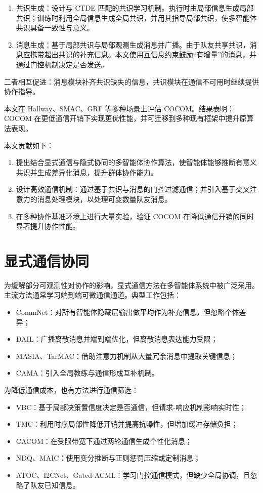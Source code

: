 \begin{enumerate}
    \item 共识生成：设计与 CTDE 匹配的共识学习机制。执行时由局部信息生成局部共识；训练时利用全局信息生成全局共识，并用其指导局部共识，使多智能体共识具备一致性与意义。
    \item 消息生成：基于局部共识与局部观测生成消息并广播。由于队友共享共识，消息应携带超出共识的补充信息。本文使用互信息约束鼓励“有增量”的消息，并通过门控机制决定是否发送。
\end{enumerate}

二者相互促进：消息模块补齐共识缺失的信息，共识模块在通信不可用时继续提供协作指导。

本文在 Hallway、SMAC、GRF 等多种场景上评估 COCOM。结果表明：COCOM 在更低通信开销下实现更优性能，并可迁移到多种现有框架中提升原算法表现。

本文贡献如下：

\begin{enumerate}
    \item 提出结合显式通信与隐式协同的多智能体协作算法，使智能体能够推断有意义共识并生成差异化消息，提升群体协作能力。
    \item 设计高效通信机制：通过基于共识与消息的门控过滤通信；并引入基于交叉注意力的消息处理模块，以处理可变数量队友消息。
    \item 在多种协作基准环境上进行大量实验，验证 COCOM 在降低通信开销的同时显著提升协作性能。
\end{enumerate}

\section*{显式通信协同}

为缓解部分可观测性对协作的影响，显式通信方法在多智能体系统中被广泛采用。主流方法通常学习端到端可微通信通道。典型工作包括：

\begin{itemize}
    \item CommNet：对所有智能体隐藏层输出做平均作为补充信息，但忽略个体差异；
    \item DAIL：广播离散消息并端到端优化，但离散消息表达能力受限；
    \item MASIA、TarMAC：借助注意力机制从大量冗余消息中提取关键信息；
    \item CAMA：引入全局教练与通信形成互补机制。
\end{itemize}

为降低通信成本，也有方法进行通信筛选：

\begin{itemize}
    \item VBC：基于局部决策置信度决定是否通信，但请求-响应机制影响实时性；
    \item TMC：利用时序局部性降低开销并提高抗噪性，但增加缓冲存储负担；
    \item CACOM：在受限带宽下通过两轮通信生成个性化消息；
    \item NDQ、MAIC：使用变分推断与正则惩罚压缩或定制消息；
    \item ATOC、I2CNet、Gated-ACML：学习门控通信模式，但缺少全局协调，且忽略了队友已知信息。
\end{itemize}


